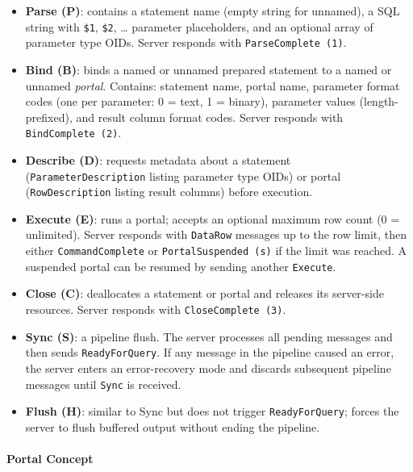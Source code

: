 \begin{itemize}
    \item \textbf{Parse (P)}: contains a statement name (empty string for unnamed), a SQL string with \texttt{\$1}, \texttt{\$2}, \ldots{} parameter placeholders, and an optional array of parameter type OIDs. Server responds with \texttt{ParseComplete (1)}.

    \item \textbf{Bind (B)}: binds a named or unnamed prepared statement to a named or unnamed \emph{portal}. Contains: statement name, portal name, parameter format codes (one per parameter: 0 = text, 1 = binary), parameter values (length-prefixed), and result column format codes. Server responds with \texttt{BindComplete (2)}.

    \item \textbf{Describe (D)}: requests metadata about a statement (\texttt{ParameterDescription} listing parameter type OIDs) or portal (\texttt{RowDescription} listing result columns) before execution.

    \item \textbf{Execute (E)}: runs a portal; accepts an optional maximum row count (0 = unlimited). Server responds with \texttt{DataRow} messages up to the row limit, then either \texttt{CommandComplete} or \texttt{PortalSuspended (s)} if the limit was reached. A suspended portal can be resumed by sending another \texttt{Execute}.

    \item \textbf{Close (C)}: deallocates a statement or portal and releases its server-side resources. Server responds with \texttt{CloseComplete (3)}.

    \item \textbf{Sync (S)}: a pipeline flush. The server processes all pending messages and then sends \texttt{ReadyForQuery}. If any message in the pipeline caused an error, the server enters an error-recovery mode and discards subsequent pipeline messages until \texttt{Sync} is received.

    \item \textbf{Flush (H)}: similar to Sync but does not trigger \texttt{ReadyForQuery}; forces the server to flush buffered output without ending the pipeline.
\end{itemize}

\paragraph{Portal Concept}

